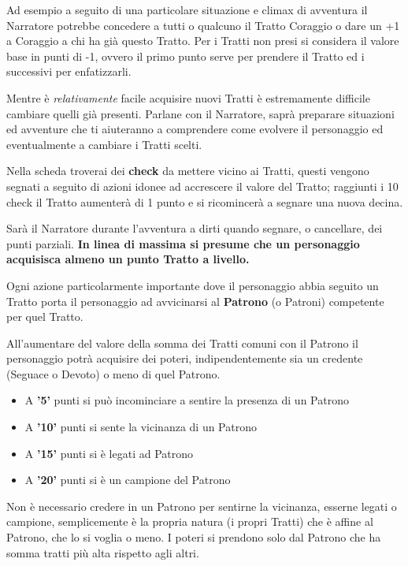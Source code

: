 \begin{multicols}{2}
Ad esempio a seguito di una particolare situazione e climax di avventura il Narratore potrebbe concedere a tutti o qualcuno il Tratto Coraggio o dare un +1 a Coraggio a chi ha già questo Tratto. Per i Tratti non presi si considera il valore base in punti di -1, ovvero il primo punto serve per prendere il Tratto ed i successivi per enfatizzarli.

Mentre è \emph{relativamente} facile acquisire nuovi Tratti è estremamente difficile cambiare quelli già presenti. Parlane con il Narratore, saprà preparare situazioni ed avventure che ti aiuteranno a comprendere come evolvere il personaggio ed eventualmente a cambiare i Tratti scelti.

Nella scheda troverai dei \textbf{check} da mettere vicino ai Tratti, questi vengono segnati a seguito di azioni idonee ad accrescere il valore del Tratto; raggiunti i 10 check il Tratto aumenterà di 1 punto e si ricomincerà a segnare una nuova decina.

Sarà il Narratore durante l'avventura a dirti quando segnare, o cancellare, dei punti parziali. \textbf{In linea di massima si presume che un personaggio acquisisca almeno un punto Tratto a livello.}

Ogni azione particolarmente importante dove il personaggio abbia seguito un Tratto porta il personaggio ad avvicinarsi al \textbf{Patrono} (o Patroni) competente per quel Tratto.

All'aumentare del valore della somma dei Tratti comuni con il Patrono il personaggio potrà acquisire dei poteri, indipendentemente sia un credente (Seguace o Devoto) o meno di quel Patrono.

\noindent\begin{itemize}[leftmargin=*] \setlength{\itemsep}{0pt}
\item A \textbf{'5'} punti si può incominciare a sentire la presenza di un Patrono

\item A \textbf{'10'} punti si sente la vicinanza di un Patrono

\item A \textbf{'15'} punti si è legati ad Patrono

\item A \textbf{'20'} punti si è un campione del Patrono
\end{itemize}

Non è necessario credere in un Patrono per sentirne la vicinanza, esserne legati o campione, semplicemente è la propria natura (i propri Tratti) che è affine al Patrono, che lo si voglia o meno. I poteri si prendono solo dal Patrono che ha somma tratti più alta rispetto agli altri.


\end{multicols}
